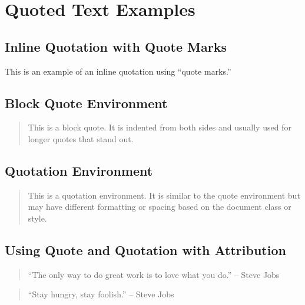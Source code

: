 \documentclass{article}
\begin{document}
\section{Quoted Text Examples}

\subsection{Inline Quotation with Quote Marks}
This is an example of an inline quotation using ``quote marks.''

\subsection{Block Quote Environment}
\begin{quote}
    This is a block quote. It is indented from both sides and usually used for longer quotes that stand out.
\end{quote}

\subsection{Quotation Environment}
\begin{quotation}
    This is a quotation environment. It is similar to the quote environment but may have different formatting or spacing based on the document class or style.
\end{quotation}

\subsection{Using Quote and Quotation with Attribution}
\begin{quote}
    ``The only way to do great work is to love what you do.'' -- Steve Jobs
\end{quote}

\begin{quotation}
    ``Stay hungry, stay foolish.'' -- Steve Jobs
\end{quotation}
\end{document}
